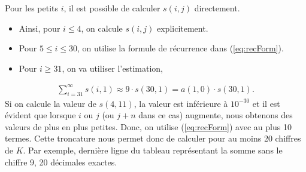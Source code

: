 Pour les petits $i$, il est possible de calculer $s(i,j)$ directement.
\begin{itemize}
	\item[\textbullet] Ainsi, pour $i\le4$, on calcule $s(i, j)$ explicitement.
	\item[\textbullet] Pour $5\le i\le30$, on utilise la formule de r\'ecurrence
		dans (\ref{eq:recForm}).
	\item[\textbullet] Pour $i\ge31$, on va utiliser l'estimation,
\end{itemize}
\begin{gather*}
	\sum_{i=31}^{\infty} s(i,1) \approx 9 \cdot s(30, 1) = a(1,0)\cdot s(30,1).
\end{gather*}
Si on calcule la valeur de $s(4, 11)$, la valeur est inférieure à $10^{-30}$ et
il est évident que lorsque $i$ ou $j$ (ou $j+n$ dans ce cas) augmente, nous
obtenons des valeurs de plus en plus petites. Donc, on utilise
(\ref{eq:recForm}) avec au plus 10 termes. Cette troncature nous permet donc de
calculer pour au moins 20 chiffres de $K$. Par exemple, dernière ligne du
tableau représentant la somme sans le chiffre 9, 20 décimales exactes.
\begin{table}[h!]
	\centering
	\caption{Les valeurs sont tir\'ees de \cite{baillie}}
\end{table}
\pagebreak
